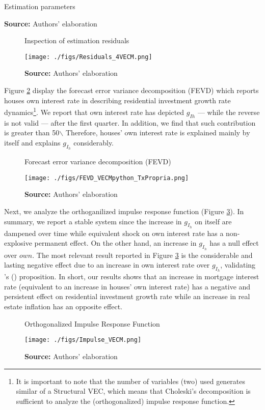 \documentclass[11pt]{article}
\begin{document}
\begin{table}[h!]
	\caption{Estimation parameters}
	\centering
	
	\caption*{\textbf{Source:} Authors' elaboration}
\end{table}

\begin{figure}
	\centering
	\caption{Inspection of estimation residuals}
	\label{residuos}
	\texttt{[image: ./figs/Residuals\_4VECM.png]}
	\caption*{\textbf{Source:} Authors' elaboration}
\end{figure}

Figure \ref{fevd} display the forecast error variance decomposition (FEVD) which reports houses own interest rate in describing residential investment growth rate dynamics\footnote{It is important to note that the number of variables (two) used generates similar  of a Structural VEC, which means that Choleski's decomposition is sufficient to analyze the (orthogonalized) impulse response function.}.
We report that own interest rate has  depicted  \(g_{Ih}\) --- while the reverse is not valid --- after the first quarter.
In addition, we find that such contribution is greater than 50$\backslash$%
Therefore, houses' own interest rate is explained mainly by itself and explains \(g_{I_h}\) considerably.

\begin{figure}[H]
	\centering
	\caption{Forecast error variance decomposition (FEVD)}
	\label{fevd}
	\texttt{[image: ./figs/FEVD\_VECMpython\_TxPropria.png]}
	\caption*{\textbf{Source:} Authors' elaboration}
\end{figure}

Next, we analyze the orthoganilized impulse response function (Figure \ref{irf}).
In summary, we report a stable system since the increase in \(g_{I_h}\) on itself are dampened over time while equivalent shock on own interest rate has a non-explosive permanent effect.
On the other hand, an increase in \(g_{I_h}\) has a null effect over \(own\).
The most relevant result reported in Figure \ref{irf} is the considerable and lasting negative effect due to an increase in own interest rate over \(g_{I_h}\), validating \citeauthor{teixeira_crescimento_2015}'s (\citeyear{teixeira_crescimento_2015}) proposition.
In short, our results shows that an increase in mortgage interest rate (equivalent to an increase in houses' own interest rate) has a negative and persistent effect on residential investment growth rate while an increase in real estate inflation  has an opposite effect.
\begin{figure}[H]
	\centering
	\caption{Orthogonalized Impulse Response Function}
	\label{irf}
	\texttt{[image: ./figs/Impulse\_VECM.png]}
	\caption*{\textbf{Source:} Authors' elaboration}
\end{figure}
\end{document}
